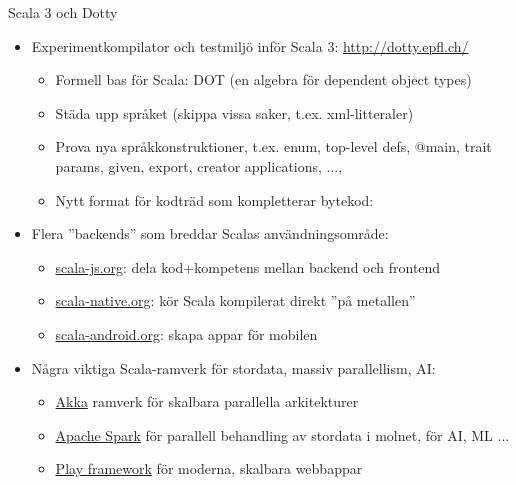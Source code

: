 \begin{Slide}{Scala 3 och Dotty}\SlideFontSmall
\begin{itemize}
\item Experimentkompilator och testmiljö inför Scala 3:  \url{http://dotty.epfl.ch/}
\begin{itemize}\SlideFontTiny
  \item Formell bas för Scala: DOT (en algebra för dependent object types)
  \item Städa upp språket (skippa vissa saker, t.ex. xml-litteraler)
  \item Prova nya språkkonstruktioner, t.ex. enum, top-level defs, @main, trait params, given, export, creator applications, ...,
  \item Nytt format för kodträd som kompletterar bytekod: \\
\end{itemize}
\item Flera ''backends'' som breddar Scalas användningsområde:
\begin{itemize}\SlideFontTiny
  \item \href{http://www.scala-js.org/}{scala-js.org}: dela kod+kompetens mellan backend och frontend
  \item \href{http://scala-native.org}{scala-native.org}: kör Scala kompilerat direkt ''på metallen''
  \item \href{http://scala-android.org}{scala-android.org}: skapa appar för mobilen
\end{itemize}
\item Några viktiga Scala-ramverk för stordata, massiv parallellism, AI:
\begin{itemize}\SlideFontTiny
  \item \href{https://akka.io/}{Akka} ramverk för skalbara parallella arkitekturer
  \item \href{https://spark.apache.org/}{Apache Spark} för parallell behandling av stordata i molnet, för AI, ML ...
  \item \href{https://www.playframework.com/}{Play framework} för moderna, skalbara webbappar
\end{itemize}
\end{itemize}
\end{Slide}





